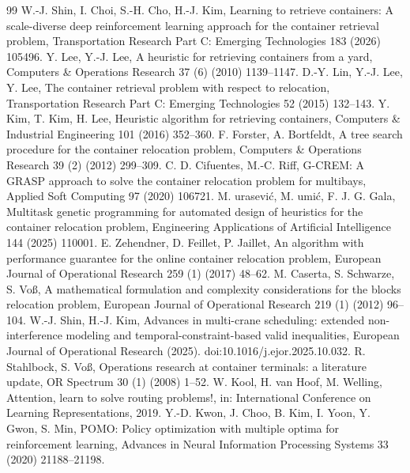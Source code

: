 \documentclass[11pt,a4paper]{elsarticle}
\begin{document}

\begin{thebibliography}{99}
 W.-J. Shin, I. Choi, S.-H. Cho, H.-J. Kim, Learning to retrieve containers: A scale-diverse deep reinforcement learning approach for the container retrieval problem, Transportation Research Part C: Emerging Technologies 183 (2026) 105496.
 Y. Lee, Y.-J. Lee, A heuristic for retrieving containers from a yard, Computers \& Operations Research 37 (6) (2010) 1139--1147.
 D.-Y. Lin, Y.-J. Lee, Y. Lee, The container retrieval problem with respect to relocation, Transportation Research Part C: Emerging Technologies 52 (2015) 132--143.
 Y. Kim, T. Kim, H. Lee, Heuristic algorithm for retrieving containers, Computers \& Industrial Engineering 101 (2016) 352--360.
 F. Forster, A. Bortfeldt, A tree search procedure for the container relocation problem, Computers \& Operations Research 39 (2) (2012) 299--309.
 C. D. Cifuentes, M.-C. Riff, G-CREM: A GRASP approach to solve the container relocation problem for multibays, Applied Soft Computing 97 (2020) 106721.
 M. {\DJ}urasevi{\'c}, M. {\DJ}umi{\'c}, F. J. G. Gala, Multitask genetic programming for automated design of heuristics for the container relocation problem, Engineering Applications of Artificial Intelligence 144 (2025) 110001.
 E. Zehendner, D. Feillet, P. Jaillet, An algorithm with performance guarantee for the online container relocation problem, European Journal of Operational Research 259 (1) (2017) 48--62.
 M. Caserta, S. Schwarze, S. Vo{\ss}, A mathematical formulation and complexity considerations for the blocks relocation problem, European Journal of Operational Research 219 (1) (2012) 96--104.
 W.-J. Shin, H.-J. Kim, Advances in multi-crane scheduling: extended non-interference modeling and temporal-constraint-based valid inequalities, European Journal of Operational Research (2025). doi:10.1016/j.ejor.2025.10.032.
 R. Stahlbock, S. Vo{\ss}, Operations research at container terminals: a literature update, OR Spectrum 30 (1) (2008) 1--52.
 W. Kool, H. van Hoof, M. Welling, Attention, learn to solve routing problems!, in: International Conference on Learning Representations, 2019.
 Y.-D. Kwon, J. Choo, B. Kim, I. Yoon, Y. Gwon, S. Min, POMO: Policy optimization with multiple optima for reinforcement learning, Advances in Neural Information Processing Systems 33 (2020) 21188--21198.

\end{thebibliography}
\end{document}
